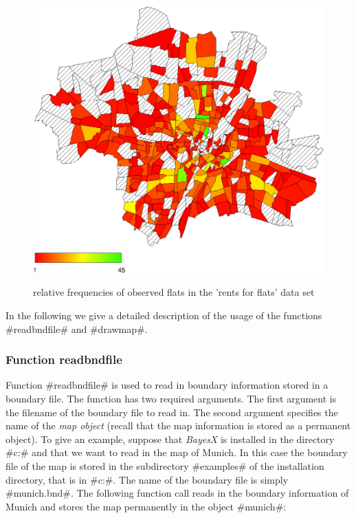 \begin{figure}[ht]
\begin{center}
\includegraphics[scale=0.5]{grafiken/munichfr.eps}
{\em\caption{ \label{munichrelfreq} relative frequencies of
observed flats in the 'rents for flats' data set}}
\end{center}
\end{figure}


In the following we give a detailed description of the usage of
the functions #readbndfile# and #drawmap#.

\subsubsection*{Function readbndfile}
  

Function #readbndfile# is used to read in boundary information
stored in a boundary file. The function has two required arguments.
The first argument is the filename of the boundary file to read in.
The second argument specifies the name of the {\em map object}
(recall that the map information is stored as a permanent object).
To give an example, suppose that {\em BayesX} is installed in the
directory #c:\bayes# and that we want to read in the map of Munich.
In this case the boundary file of the map is stored in the
subdirectory #examples# of the installation directory, that is in
#c:\bayes\examples#. The name of the boundary file is simply
#munich.bnd#. The following function call reads in the boundary
information of Munich and stores the map permanently in the object
#munich#:

